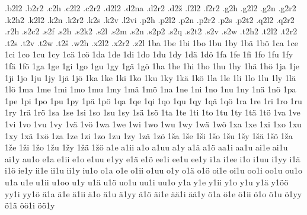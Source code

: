 %
.b2l2
.b2r2
.c2h
.c2l2
.c2r2
.d2l2
.d2na
.d2r2
.d2ž
.f2l2
.f2r2
.g2h
.g2l2
.g2n
.g2r2
.k2h2
.k2l2
.k2n
.k2r2
.k2s
.k2v
.l2vi
.p2h
.p2l2
.p2n
.p2r2
.p2s
.p2t2
.q2l2
.q2r2
.r2h
.s2c2
.s2f
.s2h
.s2k2
.s2l
.s2m
.s2n
.s2p2
.s2q
.s2t2
.s2v
.s2w
.t2h2
.t2l2
.t2r2
.t2s
.t2v
.t2w
.t2š
.w2h
.x2l2
.x2r2
.z2l
1ba
1be
1bi
1bo
1bu
1by
1bä
1bö
1ca
1ce
1ci
1co
1cu
1cy
1cä
1cö
1da
1de
1di
1do
1du
1dy
1dä
1dö
1fa
1fe
1fi
1fo
1fu
1fy
1fä
1fö
1ga
1ge
1gi
1go
1gu
1gy
1gä
1gö
1ha
1he
1hi
1ho
1hu
1hy
1hä
1hö
1ja
1je
1ji
1jo
1ju
1jy
1jä
1jö
1ka
1ke
1ki
1ko
1ku
1ky
1kä
1kö
1la
1le
1li
1lo
1lu
1ly
1lä
1lö
1ma
1me
1mi
1mo
1mu
1my
1mä
1mö
1na
1ne
1ni
1no
1nu
1ny
1nä
1nö
1pa
1pe
1pi
1po
1pu
1py
1pä
1pö
1qa
1qe
1qi
1qo
1qu
1qy
1qä
1qö
1ra
1re
1ri
1ro
1ru
1ry
1rä
1rö
1sa
1se
1si
1so
1su
1sy
1sä
1sö
1ta
1te
1ti
1to
1tu
1ty
1tä
1tö
1va
1ve
1vi
1vo
1vu
1vy
1vä
1vö
1wa
1we
1wi
1wo
1wu
1wy
1wä
1wö
1xa
1xe
1xi
1xo
1xu
1xy
1xä
1xö
1za
1ze
1zi
1zo
1zu
1zy
1zä
1zö
1ša
1še
1ši
1šo
1šu
1šy
1šä
1šö
1ža
1že
1ži
1žo
1žu
1žy
1žä
1žö
a1e
a1ii
a1o
a1uu
a1y
a1ä
a1ö
aa1i
aa1u
ai1e
ai1u
ai1y
au1o
e1a
e1ii
e1o
e1uu
e1yy
e1ä
e1ö
ee1i
ee1u
ee1y
i1a
i1ee
i1o
i1uu
i1yy
i1ä
i1ö
ie1y
ii1e
ii1u
ii1y
iu1o
o1a
o1e
o1ii
o1uu
o1y
o1ä
o1ö
oi1e
oi1u
oo1i
oo1u
ou1o
u1a
u1e
u1ii
u1oo
u1y
u1ä
u1ö
uo1u
uu1i
uu1o
y1a
y1e
y1ii
y1o
y1u
y1ä
y1öö
yy1i
yy1ö
ä1a
ä1e
ä1ii
ä1o
ä1u
ä1yy
ä1ö
äi1e
ää1i
ää1y
ö1a
ö1e
ö1ii
ö1o
ö1u
ö1yy
ö1ä
öö1i
öö1y
